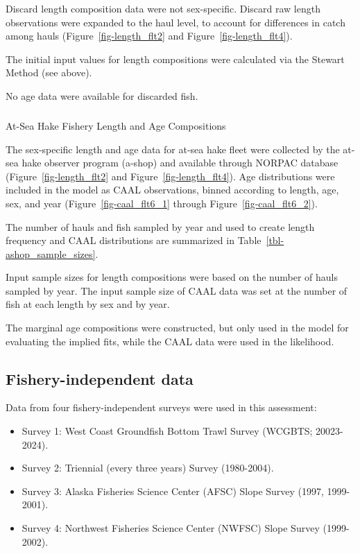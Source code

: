 \documentclass[
]{scrartcl}
\makeatletter
\let\oldsubparagraph\subparagraph
\renewcommand{\subparagraph}{
    \@ifstar
      \xxxSubParagraphStar
      \xxxSubParagraphNoStar
  }
\newcommand{\xxxSubParagraphStar}[1]{\oldsubparagraph*{#1}\mbox{}}
\newcommand{\xxxSubParagraphNoStar}[1]{\oldsubparagraph{#1}\mbox{}}
\providecommand{\tightlist}{%
  \setlength{\itemsep}{0pt}\setlength{\parskip}{0pt}}\usepackage{longtable,booktabs,array}
\makeatother
\begin{document}
Discard length composition data were not sex-specific. Discard raw
length observations were expanded to the haul level, to account for
differences in catch among hauls (Figure~\ref{fig-length_flt2} and
Figure~\ref{fig-length_flt4}).

The initial input values for length compositions were calculated via the
Stewart Method (see above).

No age data were available for discarded fish.

\subparagraph{At-Sea Hake Fishery Length and Age
Compositions}\label{at-sea-hake-fishery-length-and-age-compositions}

The sex-specific length and age data for at-sea hake fleet were
collected by the at-sea hake observer program (a-shop) and available
through NORPAC database (Figure~\ref{fig-length_flt2} and
Figure~\ref{fig-length_flt4}). Age distributions were included in the
model as CAAL observations, binned according to length, age, sex, and
year (Figure~\ref{fig-caal_flt6_1} through
Figure~\ref{fig-caal_flt6_2}).

The number of hauls and fish sampled by year and used to create length
frequency and CAAL distributions are summarized in
Table~\ref{tbl-ashop_sample_sizes}.

Input sample sizes for length compositions were based on the number of
hauls sampled by year. The input sample size of CAAL data was set at the
number of fish at each length by sex and by year.

The marginal age compositions were constructed, but only used in the
model for evaluating the implied fits, while the CAAL data were used in
the likelihood.

\subsection{Fishery-independent data}\label{sec-surveys}

Data from four fishery-independent surveys were used in this assessment:

\begin{itemize}
\tightlist
\item
  Survey 1: West Coast Groundfish Bottom Trawl Survey (WCGBTS;
  20023-2024).
\item
  Survey 2: Triennial (every three years) Survey (1980-2004).
\item
  Survey 3: Alaska Fisheries Science Center (AFSC) Slope Survey (1997,
  1999-2001).
\item
  Survey 4: Northwest Fisheries Science Center (NWFSC) Slope Survey
  (1999-2002).
\end{itemize}
\end{document}
